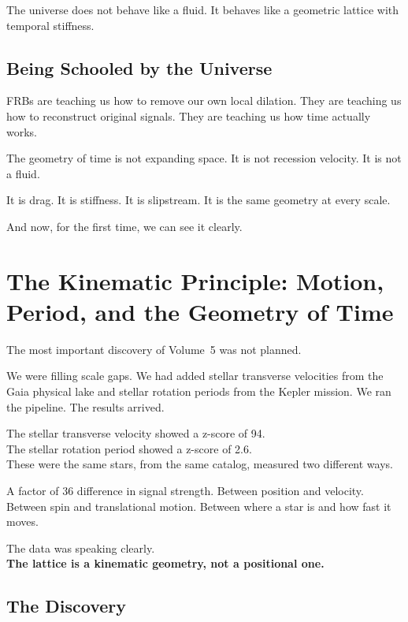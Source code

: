 \documentclass[11pt, letterpaper, openany]{book}
\begin{document}
The universe does not behave like a fluid.
It behaves like a geometric lattice with temporal stiffness.

\section*{Being Schooled by the Universe}

FRBs are teaching us how to remove our own local dilation.
They are teaching us how to reconstruct original signals.
They are teaching us how time actually works.

The geometry of time is not expanding space.
It is not recession velocity.
It is not a fluid.

It is drag.
It is stiffness.
It is slipstream.
It is the same geometry at every scale.

And now, for the first time, we can see it clearly.

\chapter{The Kinematic Principle: Motion, Period, and the Geometry of Time}
\label{ch:kinematic}

The most important discovery of Volume~5 was not planned.

We were filling scale gaps. We had added stellar transverse velocities from the Gaia physical
lake and stellar rotation periods from the Kepler mission. We ran the pipeline. The results
arrived.

The stellar transverse velocity showed a z-score of 94.\\
The stellar rotation period showed a z-score of 2.6.\\
These were the same stars, from the same catalog, measured two different ways.

A factor of 36 difference in signal strength. Between position and velocity. Between spin and
translational motion. Between where a star is and how fast it moves.

The data was speaking clearly.\\
\textbf{The lattice is a kinematic geometry, not a positional one.}

\section*{The Discovery}
\end{document}
